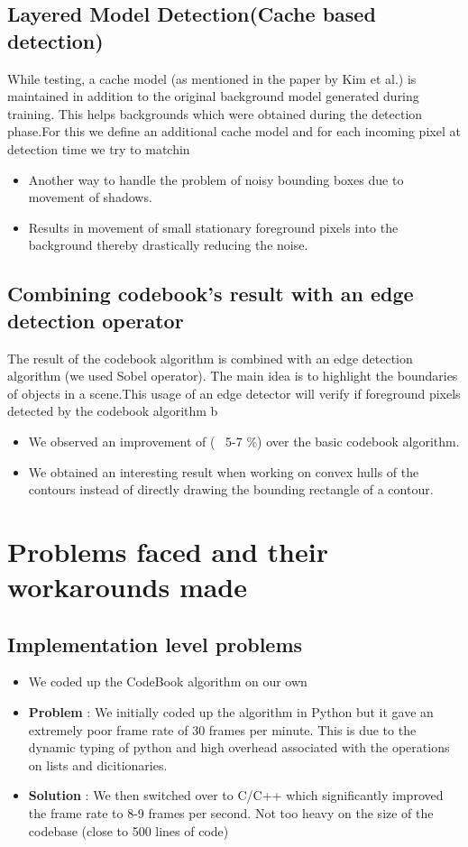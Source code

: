 \documentclass[12pt,a4paper]{report}
\begin{document}
\subsection*{Layered Model Detection(Cache based detection)}
While testing, a cache model (as mentioned in the paper by Kim et al.) is maintained in addition to the original background model generated during training. This helps
backgrounds which were obtained during the detection phase.For this we define an additional cache model and for each incoming pixel at detection time we try to matchin
\begin{itemize}
\item Another way to handle the problem of noisy bounding boxes due to movement of shadows.
\item Results in movement of small stationary foreground pixels into the background thereby drastically reducing the noise.
\end{itemize}

\subsection*{Combining codebook's result with an edge detection operator}
The result of the codebook algorithm is combined with an edge detection algorithm (we used Sobel operator).
The main idea is to highlight the boundaries of objects in a scene.This usage of an edge detector will verify if foreground pixels detected by the codebook algorithm b
\begin{itemize}
\item We observed an improvement of (~ 5-7 \%) over the basic codebook algorithm.
\item We obtained an interesting result when working on convex hulls of the contours instead of directly drawing the bounding rectangle of a contour.
\end{itemize}

\section*{Problems faced and their workarounds made}
\subsection*{Implementation level problems}
\begin{itemize}
\item We coded up the CodeBook algorithm on our own
\item \textbf{Problem} : We initially coded up the algorithm in Python but it gave an extremely poor frame rate of 30 frames per minute. This is due to the dynamic typing of python and high overhead associated with the operations on lists and dicitionaries. 
\item \textbf{Solution} : We then switched over to C/C++ which significantly improved the frame rate to 8-9 frames per second. Not too heavy on the size of the codebase (close to 500 lines of code)
\end{itemize}
\end{document}
